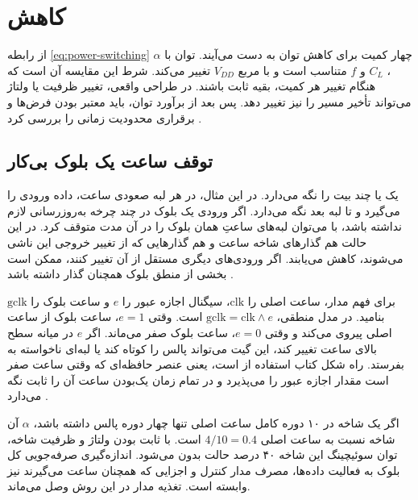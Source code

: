 \section{کاهش }
\label{sec:power-dynamic-reduction}

از رابطه \eqref{eq:power-switching} چهار کمیت برای کاهش توان به دست
می‌آیند. توان با \(\alpha\)، \(C_L\) و \(f\) متناسب است و با
مربع \(V_{DD}\) تغییر می‌کند. شرط این مقایسه آن است که هنگام تغییر
هر کمیت، بقیه ثابت باشند. در طراحی واقعی، تغییر ظرفیت یا ولتاژ می‌تواند
تأخیر مسیر را نیز تغییر دهد. پس بعد از برآورد توان، باید معتبر بودن
فرض‌ها و برقراری محدودیت زمانی را بررسی کرد
\cite[بخش ، صفحات ۱۸۵ تا ۱۹۳]{weste}
\cite[اسلایدهای ۱۳ و ۱۷ تا ۱۹]{powerslides}.

\subsection{توقف ساعت یک بلوک بی‌کار}
\label{sec:power-clock-gating}

 یک یا چند بیت را نگه می‌دارد. در این مثال، در هر لبه
صعودی ساعت، داده ورودی را می‌گیرد و تا لبه بعد نگه می‌دارد. اگر
 ورودی یک بلوک در چند چرخه به‌روزرسانی لازم نداشته باشد،
با  می‌توان لبه‌های ساعتِ همان بلوک را در آن مدت
متوقف کرد. در این حالت هم گذارهای شاخه ساعت و هم گذارهایی که از
تغییر خروجی این  ناشی می‌شوند، کاهش می‌یابند. اگر
ورودی‌های دیگری مستقل از آن  تغییر کنند، ممکن است بخشی
از منطق بلوک همچنان گذار داشته باشد
\cite[بخش ، صفحه ۱۸۶]{weste}
\cite[اسلاید ۱۷]{powerslides}.

برای فهم مدار، ساعت اصلی را \(\mathrm{clk}\)، سیگنال اجازه عبور را
\(e\) و ساعت بلوک را \(\mathrm{gclk}\) بنامید. در مدل منطقی،
\(\mathrm{gclk}=\mathrm{clk}\land e\) است. وقتی \(e=1\)، ساعت
بلوک از ساعت اصلی پیروی می‌کند و وقتی \(e=0\)، ساعت بلوک صفر
می‌ماند. اگر \(e\) در میانه سطح بالای ساعت تغییر کند، این گیت
می‌تواند پالس را کوتاه کند یا لبه‌ای ناخواسته به 
بفرستد. راه شکل  کتاب استفاده از  است،
یعنی عنصر حافظه‌ای که وقتی ساعت صفر است مقدار اجازه عبور را می‌پذیرد
و در تمام زمان یک‌بودن ساعت آن را ثابت نگه می‌دارد
\cite[شکل ، صفحه ۱۸۶]{weste}.

اگر یک شاخه در ۱۰ دوره کامل ساعت اصلی تنها چهار دوره پالس داشته
باشد، \(\alpha\) آن شاخه نسبت به ساعت اصلی \(4/10=0.4\) است.
با ثابت بودن ولتاژ و ظرفیت شاخه، توان سوئیچینگ این شاخه ۴۰ درصد
حالت بدون  می‌شود. اندازه‌گیری صرفه‌جویی کل بلوک
به فعالیت داده‌ها، مصرف مدار کنترل و اجزایی که همچنان ساعت می‌گیرند
نیز وابسته است. تغذیه مدار در این روش وصل می‌ماند.

